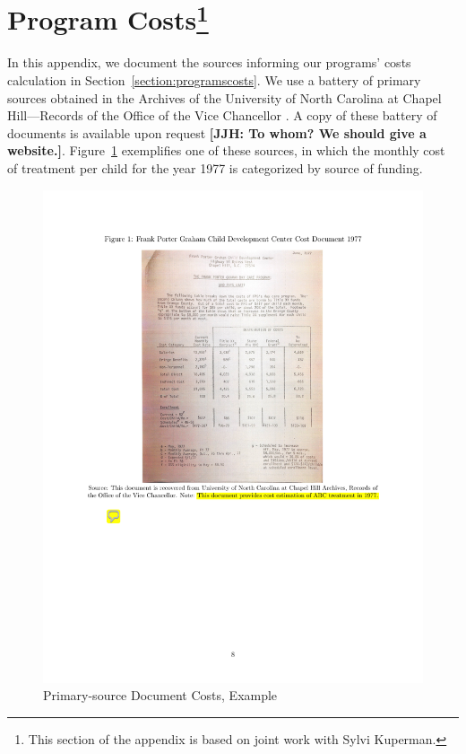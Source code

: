 \section[Program Costs of ABC/CARE]{Program Costs\footnote{This section of the appendix is based on joint work with Sylvi Kuperman.}} \label{app:programcosts}

\noindent In this appendix, we document the sources informing our programs' costs calculation in Section~\ref{section:programscosts}. We use a battery of primary sources obtained in the Archives of the University of North Carolina at Chapel Hill---Records of the Office of the Vice Chancellor \citet{UNC-Archives_Health-Affairs}. A copy of these battery of documents is available upon request \textbf{[JJH: To whom? We should give a website.]}. Figure~\ref{figure:who} exemplifies one of these sources, in which the monthly cost of treatment per child for the year 1977 is categorized by source of funding.

\begin{center}
\begin{figure}[H] 
\caption{Primary-source Document Costs, Example}
\label{figure:who}
\centering
\includegraphics[width=.9\columnwidth]{AppOutput/Program/UNC-costs.pdf}
\end{figure}
\end{center}

